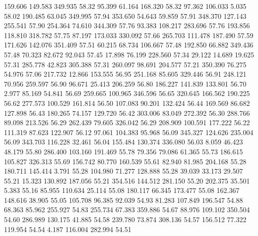  159.606  149.583  349.935        58.32
  95.399   61.164  168.320        58.32
  97.362  106.033    5.035        58.02
 190.485   63.045  349.995        57.94
 353.650   54.643   59.859        57.91
 348.370  127.143  255.541        57.90
 254.364   74.610  344.309        57.76
  93.383  108.217  283.696        57.76
 193.856  118.810  318.782        57.75
  87.197  173.033  330.092        57.66
 265.703  111.478  187.490        57.59
 171.626  142.076  351.409        57.51
  60.215   68.734  106.667        57.48
 192.850   66.882  349.436        57.48
  70.323   82.672   92.043        57.45
  17.898   76.199  228.560        57.34
  29.122   14.689   19.625        57.31
 285.778   42.823  305.388        57.31
 260.097   98.691  204.577        57.21
 350.390   76.275   54.976        57.06
 217.732   12.866  153.555        56.95
 251.168   85.605  329.446        56.91
 248.121   70.956  259.597        56.90
  96.671   25.413  206.259        56.80
 186.227  141.839  133.801        56.70
   2.977   85.169   54.841        56.69
 259.665  100.965  346.596        56.65
 320.645  166.562  190.225        56.62
 277.573  100.529  161.814        56.50
 107.083   90.201  132.424        56.44
 169.569   86.682  127.898        56.43
 180.265   74.157  129.720        56.42
 303.006   83.049  272.392        56.30
 288.766   89.098  213.526        56.29
 262.439   79.605  326.042        56.29
 208.909  100.591  177.222        56.22
 111.319   87.623  122.907        56.12
  97.061  104.383   95.968        56.09
 345.327  124.626  235.004        56.09
 343.703  116.228   32.461        56.04
 155.484  130.374  336.080        56.03
   8.059   46.423   48.179        55.80
 286.400  103.160  191.469        55.78
  79.356   79.086   61.365        55.73
 186.615  105.827  326.313        55.69
 156.742   80.770  160.539        55.61
  82.940   81.985  204.168        55.28
 180.711  145.414    3.791        55.28
 104.980   71.277  128.888        55.28
  39.039   33.173   29.507        55.21
  15.323  130.892  187.056        55.21
 354.516  144.512  281.150        55.20
 202.375   35.501    5.383        55.16
  85.955  110.634   25.114        55.08
 180.117   66.345  173.477        55.08
 162.367  148.616   38.905        55.05
 105.708   96.385   92.039        54.93
  81.283  107.849  196.547        54.88
  68.363   85.962  255.927        54.83
 255.734   67.383  359.886        54.67
  88.976  109.102  350.504        54.60
 286.989  130.175   41.885        54.58
 239.780   73.874  308.136        54.57
 156.512   77.322  119.954        54.54
   4.187  116.004  282.994        54.51
